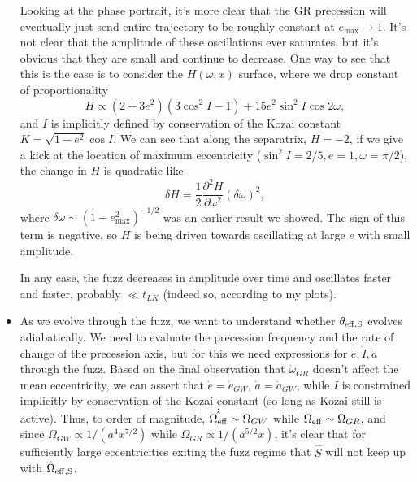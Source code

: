 \documentclass[11pt,
        usenames, %
        dvipsnames %
    ]{article}
\newcommand*{\ptd}[2]{\frac{\partial^2 #1}{\partial#2^2}}
\newcommand*{\p}[1]{\left(#1\right)}
\begin{document}
\begin{itemize}
        Looking at the phase portrait, it's more clear that the GR precession
        will eventually just send entire trajectory to be roughly constant at
        $e_{\max} \to 1$. It's not clear that the amplitude of these
        oscillations ever saturates, but it's obvious that they are small and
        continue to decrease. One way to see that this is the case is to
        consider the $H(\omega, x)$ surface, where we drop constant of
        proportionality
        \begin{equation}
            H \propto \p{2 + 3e^2}\p{3\cos^2 I - 1}
                + 15e^2\sin^2I \cos 2\omega,
        \end{equation}
        and $I$ is implicitly defined by conservation of the Kozai constant $K =
        \sqrt{1 - e^2}\cos I$. We can see that along the separatrix, $H = -2$,
        if we give a kick at the location of maximum eccentricity ($\sin^2 I =
        2/5, e = 1, \omega = \pi/2$), the change in $H$ is quadratic like
        \begin{equation}
            \delta H = \frac{1}{2}\ptd{H}{\omega}\p{\delta \omega}^2,
        \end{equation}
        where $\delta \omega \sim \p{1 - e_{\max}^2}^{-1/2}$ was an earlier
        result we showed. The sign of this term is negative, so $H$ is being
        driven towards oscillating at large $e$ with small amplitude.

        In any case, the fuzz decreases in amplitude over time and oscillates
        faster and faster, probably $\ll t_{LK}$ (indeed so, according to my
        plots).

    \item As we evolve through the fuzz, we want to understand whether
        $\theta_{\rm eff, S}$ evolves adiabatically. We need to evaluate the
        precession frequency and the rate of change of the precession axis, but
        for this we need expressions for $\dot{e}, \dot{I}, \dot{a}$ through the
        fuzz. Based on the final observation that $\dot{\omega}_{GR}$ doesn't
        affect the mean eccentricity, we can assert that $\dot{e} =
        \dot{e}_{GW}$, $\dot{a} = \dot{a}_{GW}$, while $I$ is constrained
        implicitly by conservation of the Kozai constant (so long as Kozai still
        is active). Thus, to order of magnitude, $\dot{\hat{\Omega_{\rm eff}}} \sim
        \Omega_{GW}$ while $\Omega_{\rm eff} \sim \Omega_{GR}$, and since
        $\Omega_{GW} \propto 1/\p{a^4 x^{7/2}}$ while $\Omega_{GR} \propto
        1/\p{a^{5/2}x}$, it's clear that for sufficiently large eccentricities
        exiting the fuzz regime that $\hat{S}$ will not keep up with
        $\hat{\Omega}_{\rm eff, S}$.


\end{itemize}
\end{document}

